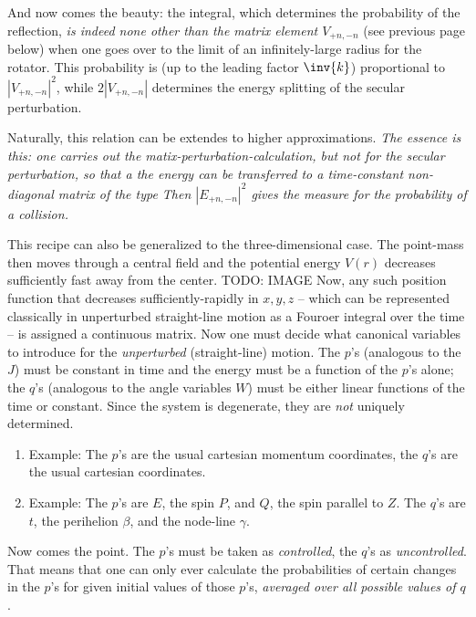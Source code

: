 And now comes the beauty: the integral, which  determines the probability of the reflection, \textit{is indeed none other than the matrix element $V_{+n,-n}$} (see previous page below) when one goes over to the limit of an infinitely-large radius for the rotator. This probability is (up to the leading factor $\inv{k}$) proportional to $|V_{+n,-n}|^2$, while $2|V_{+n,-n}|$ determines the energy splitting of the secular perturbation.

Naturally, this relation can be extendes to higher approximations. \textit{The essence is this: one carries out the matix-perturbation-calculation, but not for the secular perturbation, so that a the energy can be transferred to a time-constant non-diagonal matrix of the type
Then $|E_{+n,-n}|^2$ gives the measure for the probability of a collision.}

This recipe can also be generalized to the three-dimensional case. The point-mass then moves through a central field and the potential energy $V(r)$ decreases sufficiently fast away from the center.
TODO: IMAGE
Now, any such position function that decreases sufficiently-rapidly in $x,y,z$ -- which can be represented classically in unperturbed straight-line motion as a Fouroer integral over the time -- is assigned a continuous matrix. Now one must decide what canonical variables to introduce for the \textit{unperturbed} (straight-line) motion. The $p$'s (analogous to the  $J$) must be constant in time and the energy must be a function of the $p$'s alone; the $q$'s (analogous to the angle variables $W$) must be either linear functions of the time or constant. Since the system is degenerate, they are \textit{not} uniquely determined.

\begin{enumerate}
    \item Example: The $p$'s are the usual cartesian momentum coordinates, the $q$'s are the usual cartesian coordinates.
    \item Example: The $p$'s are $E$, the spin $P$, and $Q$, the spin parallel to $Z$. The $q$'s are $t$, the perihelion $\beta$, and the node-line $\gamma$.
\end{enumerate}


Now comes the  point. The $p$'s must be taken as \textit{controlled}, the $q$'s  as \textit{uncontrolled}. That means that one can only ever calculate the probabilities of certain changes in the $p$'s for given initial values of those $p$'s, \textit{averaged over all possible values of $q$}.

